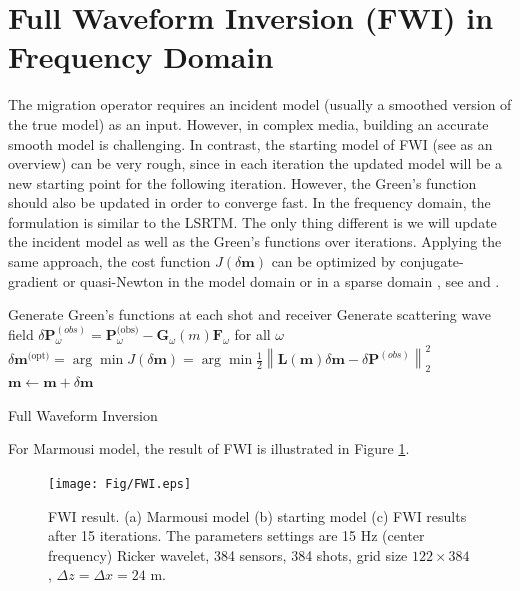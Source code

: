 \documentclass[11pt,titlepage]{article}
\newcommand{\bx}{\boldsymbol{x}}
\newcommand{\bF}{\boldsymbol{F}}
\newcommand{\bG}{\boldsymbol{G}}
\newcommand{\bL}{\boldsymbol{L}}
\newcommand{\bm}{\boldsymbol{m}}
\newcommand{\bP}{\boldsymbol{P}}
\theoremstyle{plain}
\theoremstyle{definition}
\theoremstyle{remark}
\numberwithin{equation}{section}
\begin{document}
\section{Full Waveform Inversion (FWI) in Frequency Domain}
The migration operator requires an incident model (usually a smoothed version of the true model) as an input. However, in complex media, building an accurate smooth model is challenging. In contrast, the starting model of FWI (see \cite{Virieux:2009aa} as an overview) can be very rough, since in each iteration the updated model will be a new starting point for the following iteration. However, the Green's function should also be updated in order to converge fast. In the frequency domain, the formulation is similar to the LSRTM. The only thing different is we will update the incident model as well as the Green's functions over iterations. Applying the same approach, the cost function $J(\delta \bm)$ can be optimized by conjugate-gradient or quasi-Newton in the model domain or in a sparse domain \cite{SchVdB2009} , see  and .

\begin{algorithm}[H]
\begin{algorithmic}[1]
\WHILE{$m(\bx)$ is not converged}
\STATE Generate Green's functions at each shot and receiver
\STATE Generate scattering wave field $\delta\bP^{(obs)}_{\omega}= \bP_{\omega}^{\text{(obs)}} - \bG_{\omega}(m)\bF_{\omega}$ for all $\omega$
\STATE $\delta \bm^{\text{(opt)}} = \arg\min J(\delta \bm) = \arg\min \frac{1}{2} \left\| \bL(\bm)\delta \bm - \delta\bP^{(obs)}\right\|_2^2$
\STATE $\bm \leftarrow \bm + \delta \bm$
\ENDWHILE
\end{algorithmic}
\caption{Full Waveform Inversion}
\end{algorithm}

For Marmousi model, the result of FWI is illustrated in Figure \ref{fig:FWI}.
\begin{figure}[htbp]
\centering
\texttt{[image: Fig/FWI.eps]}
\caption{FWI result. (a) Marmousi model (b) starting model (c) FWI results after 15 iterations. The parameters settings are 15 Hz (center frequency) Ricker wavelet, 384 sensors, 384 shots, grid size $122 \times 384$, $\Delta z = \Delta x = 24$ m.}
\label{fig:FWI}
\end{figure}
\end{document}
